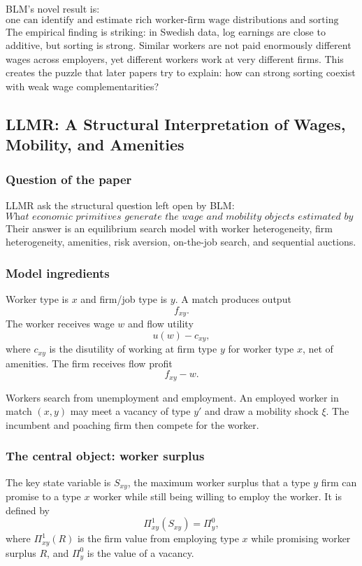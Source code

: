 \documentclass[11pt]{article}
\newcommand{\1}{\mathbf{1}}
\begin{document}
BLM's novel result is:
\[
\boxed{
\text{one can identify and estimate rich worker-firm wage distributions and sorting patterns in short panels.}
}
\]
The empirical finding is striking: in Swedish data, log earnings are close to additive, but sorting is strong. Similar workers are not paid enormously different wages across employers, yet different workers work at very different firms. This creates the puzzle that later papers try to explain: how can strong sorting coexist with weak wage complementarities?

\subsection{LLMR: A Structural Interpretation of Wages, Mobility, and Amenities}

\subsubsection*{Question of the paper}

LLMR ask the structural question left open by BLM:
\[
\textit{What economic primitives generate the wage and mobility objects estimated by BLM?}
\]
Their answer is an equilibrium search model with worker heterogeneity, firm heterogeneity, amenities, risk aversion, on-the-job search, and sequential auctions.

\subsubsection*{Model ingredients}

Worker type is $x$ and firm/job type is $y$. A match produces output
\[
f_{xy}.
\]
The worker receives wage $w$ and flow utility
\[
u(w)-c_{xy},
\]
where $c_{xy}$ is the disutility of working at firm type $y$ for worker type $x$, net of amenities. The firm receives flow profit
\[
f_{xy}-w.
\]

Workers search from unemployment and employment. An employed worker in match $(x,y)$ may meet a vacancy of type $y'$ and draw a mobility shock $\xi$. The incumbent and poaching firm then compete for the worker.

\subsubsection*{The central object: worker surplus}

The key state variable is $S_{xy}$, the maximum worker surplus that a type $y$ firm can promise to a type $x$ worker while still being willing to employ the worker. It is defined by
\[
\Pi^1_{xy}(S_{xy})=\Pi^0_y,
\]
where $\Pi^1_{xy}(R)$ is the firm value from employing type $x$ while promising worker surplus $R$, and $\Pi^0_y$ is the value of a vacancy.
\end{document}
